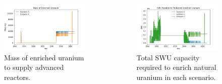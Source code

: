 \begin{frame}
\begin{columns}
\begin{figure}[t]
      \includegraphics[trim=0 8 0 10,clip,width=\linewidth]{figures/enrichedU_advancedrx.png}
            \vspace*{-0.5cm}
      \caption{Mass of enriched uranium to supply advanced reactors.}
      \label{fig:enrichedU}
  \end{figure}
            \vspace*{-0.5cm}
  \begin{figure}[h]
      \includegraphics[trim=0 8 0 10,clip,width=\linewidth]{figures/swu_all.png}
            \vspace*{-0.5cm}
      \caption{Total \gls{SWU} capacity required to enrich natural uranium in each scenario.}
      \label{fig:swu}
  \end{figure}
  \end{columns}
\end{frame}


